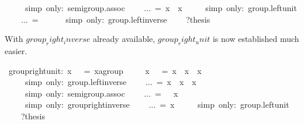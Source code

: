 \begin{isabelle}
\ \ \ \ \ {\isacharparenleft}simp\ only:\ semigroup.assoc{\isacharparenright}\isanewline
\ \ \ \ {\isachardoublequote}...\ =\ {\isacharparenleft}x{\isasyminv}{\isacharparenright}{\isasyminv}\ {\isasymOtimes}\ x{\isasyminv}{\isachardoublequote}\isanewline
\ \ \ \ \ {\isacharparenleft}simp\ only:\ group.left{\isacharunderscore}unit{\isacharparenright}\isanewline
\ \ \ \ {\isachardoublequote}...\ =\ {\isasymunit}{\isachardoublequote}\isanewline
\ \ \ \ \ {\isacharparenleft}simp\ only:\ group.left{\isacharunderscore}inverse{\isacharparenright}\isanewline
\ \ \ \ ?thesis\ \isanewline
{}%
\begin{isamarkuptext}%
\noindent With $group_right_inverse$ already available,
 $group_right_unit$\label{thm:group-right-unit} is now established
 much easier.%
\end{isamarkuptext}%
\ group{\isacharunderscore}right{\isacharunderscore}unit:\ {\isachardoublequote}x\ {\isasymOtimes}\ {\isasymunit}\ =\ {\isacharparenleft}x{\isasymColon}{\isacharprime}a{\isasymColon}group{\isacharparenright}{\isachardoublequote}\isanewline
{}\ {\isacharminus}\isanewline
\ \ \ {\isachardoublequote}x\ {\isasymOtimes}\ {\isasymunit}\ =\ x\ {\isasymOtimes}\ {\isacharparenleft}x{\isasyminv}\ {\isasymOtimes}\ x{\isacharparenright}{\isachardoublequote}\isanewline
\ \ \ \ \ {\isacharparenleft}simp\ only:\ group.left{\isacharunderscore}inverse{\isacharparenright}\isanewline
\ \ \ \ {\isachardoublequote}...\ =\ x\ {\isasymOtimes}\ x{\isasyminv}\ {\isasymOtimes}\ x{\isachardoublequote}\isanewline
\ \ \ \ \ {\isacharparenleft}simp\ only:\ semigroup.assoc{\isacharparenright}\isanewline
\ \ \ \ {\isachardoublequote}...\ =\ {\isasymunit}\ {\isasymOtimes}\ x{\isachardoublequote}\isanewline
\ \ \ \ \ {\isacharparenleft}simp\ only:\ group{\isacharunderscore}right{\isacharunderscore}inverse{\isacharparenright}\isanewline
\ \ \ \ {\isachardoublequote}...\ =\ x{\isachardoublequote}\isanewline
\ \ \ \ \ {\isacharparenleft}simp\ only:\ group.left{\isacharunderscore}unit{\isacharparenright}\isanewline
\ \ \ \ ?thesis\ \isanewline
{}%
\begin{isamarkuptext}%

\end{isamarkuptext}
\end{isabelle}
